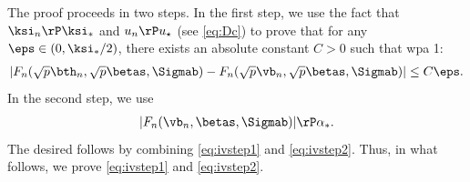 The proof proceeds in two steps. In the first step, we use the fact that $\ksi_n\rP\ksi_*$ and $u_n\rP u_\star$ (see \eqref{eq:Dc}) to prove that for any $\eps\in(0,\ksi_*/2)$, there exists an absolute constant $C>0$ such that wpa 1:
\begin{align}\label{eq:ivstep1}
|F_n(\sqrt{p}\bth_n,\sqrt{p}\betas,\Sigmab) - F_n(\sqrt{p}\vb_n,\sqrt{p}\betas,\Sigmab) | \leq C\eps.
\end{align}
In the second step, we use 
\begin{align}
|F_n(\vb_n,\betas,\Sigmab)| \rP \alpha_*.\label{eq:ivstep2}
\end{align}
The desired follows by combining \eqref{eq:ivstep1} and \eqref{eq:ivstep2}. Thus, in what follows, we prove \eqref{eq:ivstep1} and \eqref{eq:ivstep2}.


